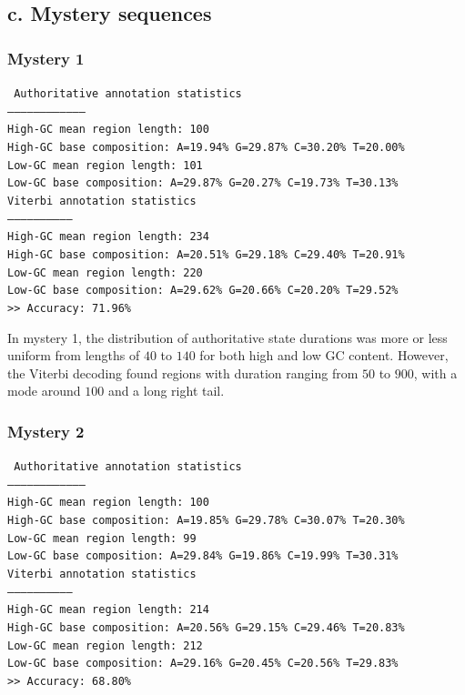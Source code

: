 \documentclass[a4paper]{article}
\begin{document}
\subsection*{c. Mystery sequences}
\subsubsection*{Mystery 1}
{\tt
Authoritative annotation statistics\\
-----------------------------------\\
High-GC mean region length:  100\\
High-GC base composition: A=19.94\% G=29.87\% C=30.20\% T=20.00\%\\
Low-GC mean region length:  101\\
Low-GC base composition: A=29.87\% G=20.27\% C=19.73\% T=30.13\%\\

\noindent Viterbi annotation statistics\\
-----------------------------\\
High-GC mean region length:  234\\
High-GC base composition: A=20.51\% G=29.18\% C=29.40\% T=20.91\%\\
Low-GC mean region length:  220\\
Low-GC base composition: A=29.62\% G=20.66\% C=20.20\% T=29.52\%\\

\noindent >> Accuracy: 71.96\%\\
}

In mystery 1, the distribution of authoritative state
durations was more or less uniform from lengths of $40$
to $140$ for both high and low GC content. However, the Viterbi
decoding found regions with duration ranging from $50$ to $900$,
with a mode around $100$ and a long right tail.

\subsubsection*{Mystery 2}
{\tt
Authoritative annotation statistics\\
-----------------------------------\\
High-GC mean region length:  100\\
High-GC base composition: A=19.85\% G=29.78\% C=30.07\% T=20.30\%\\
Low-GC mean region length:  99\\
Low-GC base composition: A=29.84\% G=19.86\% C=19.99\% T=30.31\%\\

\noindent Viterbi annotation statistics\\
-----------------------------\\
High-GC mean region length:  214\\
High-GC base composition: A=20.56\% G=29.15\% C=29.46\% T=20.83\%\\
Low-GC mean region length:  212\\
Low-GC base composition: A=29.16\% G=20.45\% C=20.56\% T=29.83\%\\

\noindent >> Accuracy: 68.80\%\\
}
\end{document}
